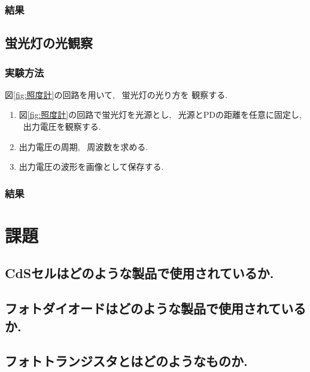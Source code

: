 \documentclass[titlepage]{jsarticle}
\begin{document}
        \subsubsection{結果}
            

    \subsection{蛍光灯の光観察}
        \subsubsection{実験方法}
            図\ref{fig:照度計}の回路を用いて, ~蛍光灯の光り方を
            観察する.

            \begin{enumerate}
                \item 図\ref{fig:照度計}の回路で蛍光灯を光源とし,
                    ~光源とPDの距離を任意に固定し, ~出力電圧を観察する.
                \item 出力電圧の周期, ~周波数を求める.
                \item 出力電圧の波形を画像として保存する.
            \end{enumerate}

        \subsubsection{結果}

\section{課題}
    \subsection{CdSセルはどのような製品で使用されているか.}

    \subsection{フォトダイオードはどのような製品で使用されているか.}

    \subsection{フォトトランジスタとはどのようなものか.}
\end{document}
